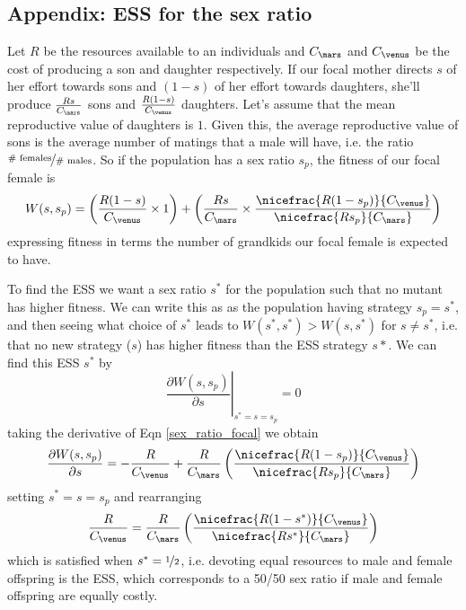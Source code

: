 {\subsection{Appendix: ESS for the sex ratio} \label{ESS_sex_Ratio}
Let $R$ be the resources available to an individuals and $C_{\mars}$ and $C_{\venus}$ be the cost of
producing a son and daughter respectively. If our focal mother directs
$s$ of her effort towards sons and $(1-s)$ of her effort towards
daughters, she'll produce $\frac{Rs}{C_{\mars}}$ sons and
$\frac{R(1-s)}{C_{\venus}}$ daughters.  Let's assume that the mean
reproductive value of daughters is $1$. Given this, the average reproductive
value of sons is the average number of matings that a male will have,
i.e. the ratio $\nicefrac{\# \textrm{~females}}{\# \textrm{~males}}$. So if the population has a sex ratio $s_p$, the fitness of our focal female is
\begin{equation}
W(s,s_p) = \left( \frac{R(1-s)}{C_{\venus}} \times 1 \right) +  \left( \frac{Rs}{C_{\mars}} \times  \frac{\nicefrac{R(1-s_p)}{C_{\venus}} }{\nicefrac{Rs_p}{C_{\mars}}} \right) \label{sex_ratio_focal}
\end{equation}
expressing fitness in terms the number of grandkids our focal female is expected to have.

To find the ESS we want a sex ratio $s^*$ for the population such that
no mutant has higher fitness. We can write this as as the population
having strategy $s_p=s^*$, and then seeing what choice of $s^*$ leads
to $W(s^*,s^*)> W(s,s^*)$ for $s \neq s^*$, i.e. that no new
strategy ($s$) has higher fitness than the ESS strategy $s*$. We can
find this ESS $s^*$ by
\begin{equation}
\left. \frac{\partial W(s,s_p)}{\partial s} \right\vert_{s^* = s=s_p} = 0
\end{equation}
taking the derivative of Eqn \ref{sex_ratio_focal} we obtain
\begin{equation}
\frac{\partial W(s,s_p)}{\partial s}  = - \frac{R}{C_{\venus}} +  \frac{R}{C_{\mars}} \left( \frac{\nicefrac{R(1-s_p)}{C_{\venus}} }{\nicefrac{Rs_p}{C_{\mars}}} \right) 
\end{equation}
setting $s^* = s=s_p$ and rearranging
\begin{equation}
\frac{R}{C_{\venus}} =  \frac{R}{C_{\mars}} \left( \frac{\nicefrac{R(1-s^*)}{C_{\venus}} }{\nicefrac{Rs^*}{C_{\mars}}} \right) 
\end{equation}
which is satisfied when $s^* = \nicefrac{1}{2}$, i.e. devoting equal resources to male and female offspring is the ESS, which corresponds to a 50/50 sex ratio if male and female offspring are equally costly. 

}
